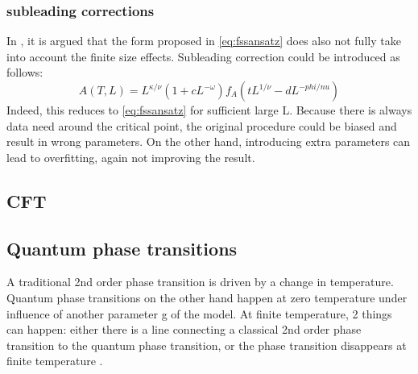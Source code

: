 \subsubsection{subleading corrections}
In \cite{Beach2005}, it is argued that the form proposed in \cref{eq:fssansatz} does also not fully take into account the finite size effects. Subleading correction could be introduced as follows:
\begin{equation}
    A(T,L) = L^{\kappa / \nu} ( 1+c L^{-\omega} ) f_A( t L ^{1/ \nu} -d L^{-phi/nu} )
\end{equation}
Indeed, this reduces to \cref{eq:fssansatz} for sufficient large L. Because there is always data need around the critical point, the original procedure could be biased and result in wrong parameters. On the other hand, introducing extra parameters can lead to overfitting, again not improving the result.

\subsection{CFT}\label{crit:cft}


\subsection{Quantum phase transitions}

A traditional 2nd order phase transition is driven by a change in temperature. Quantum phase transitions on the other hand happen at zero temperature under influence of another parameter g of the model. At finite temperature, 2 things can happen: either there is a line connecting a classical 2nd order phase transition to the quantum phase transition, or the phase transition disappears at finite temperature \cite{Sachdev1999}.

